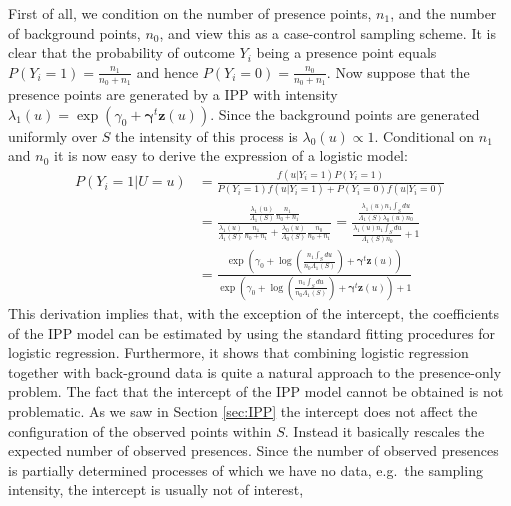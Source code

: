 First of all, we condition on the number of presence points, $n_1$, and the number of background points, $n_0$, and view this as a case-control sampling scheme. It is clear that the probability of outcome $Y_i$ being a presence point equals $P(Y_i = 1) = \frac{n_1}{n_0 + n_1}$ and hence $P(Y_i = 0) = \frac{n_0}{n_0 + n_1}$. Now suppose that the presence points are generated by a IPP with intensity $\lambda_1(u) = \exp(\gamma_0 + \bm{\gamma}^t\bm{z}(u))$. Since the background points are generated uniformly over $S$ the intensity of this process is $\lambda_0(u) \propto 1.$ Conditional on $n_1$ and $n_0$ it is now easy to derive the expression of a logistic model:
\begin{equation}
\begin{aligned}
P(Y_i = 1 | U = u) & = \frac{f(u|Y_i = 1) P(Y_i = 1)}{P(Y_i = 1) f(u|Y_i = 1) + P(Y_i = 0)f(u|Y_i = 0) } \\[0.5ex]
 & = \frac{\frac{\lambda_1(u)}{\Lambda_1(S)}\frac{n_1}{n_0 + n_1}}{\frac{\lambda_1(u)}{\Lambda_1(S)}\frac{n_1}{n_0 + n_1} + \frac{\lambda_0(u)}{\Lambda_0(S)}\frac{n_0}{n_0 + n_1}} 
 = \frac{\frac{\lambda_1(u) n_1 \int_S du }{\Lambda_1(S)\lambda_0(u) n_0}}{\frac{ \lambda_1(u) n_1 \int_S du}{\Lambda_1(S) n_0} + 1} \\[0.5ex]
 & = \frac{\exp \left( \gamma_0 + \log \left( \frac{n_1 \int_S du }{n_0\Lambda_1(S)}\right) + \bm{\gamma}^t\bm{z}(u) \right)}{\exp \left( \gamma_0 + \log \left( \frac{n_1 \int_S du }{n_0\Lambda_1(S)}\right) + \bm{\gamma}^t\bm{z}(u) \right) + 1}
\end{aligned}
\end{equation}
This derivation implies that, with the exception of the intercept, the coefficients of the IPP model can be estimated by using the standard fitting procedures for logistic regression. Furthermore, it shows that combining logistic regression together with back-ground data is quite a natural approach to the presence-only problem. The fact that the intercept of the IPP model cannot be obtained is not problematic. As we saw in Section \ref{sec:IPP} the intercept does not affect the configuration of the observed points within $S$. Instead it basically rescales the expected number of observed presences. Since the number of observed presences is partially determined processes of which we have no data, e.g.\ the sampling intensity, the intercept is usually not of interest,


